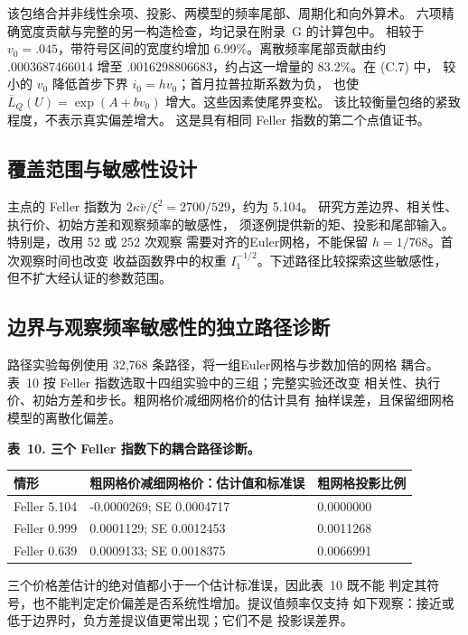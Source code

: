 该包络合并非线性余项、投影、两模型的频率尾部、周期化和向外算术。
六项精确宽度贡献与完整的另一构造检查，均记录在附录~G 的计算包中。
相较于 \(v_0=.045\)，带符号区间的宽度约增加
6.99\%。离散频率尾部贡献由约 .0003687466014 增至
.0016298806683，约占这一增量的 83.2\%。在 (C.7) 中，
较小的 \(v_0\) 降低首步下界 \(i_0=hv_0\)；首月拉普拉斯系数为负，
也使 \(\overline L_Q(U)=\exp(A+bv_0)\) 增大。这些因素使尾界变松。
该比较衡量包络的紧致程度，不表示真实偏差增大。
这是具有相同 Feller 指数的第二个点值证书。

\subsection{覆盖范围与敏感性设计}

主点的 Feller 指数为
\(2\kappa\bar v/\xi^2=2700/529\)，约为 5.104。
研究方差边界、相关性、执行价、初始方差和观察频率的敏感性，
须逐例提供新的矩、投影和尾部输入。特别是，改用 52 或 252 次观察
需要对齐的Euler网格，不能保留 \(h=1/768\)。首次观察时间也改变
收益函数界中的权重 \(I_1^{-1/2}\)。下述路径比较探索这些敏感性，
但不扩大经认证的参数范围。

\subsection{边界与观察频率敏感性的独立路径诊断}

路径实验每例使用 32,768 条路径，将一组Euler网格与步数加倍的网格
耦合。表~10 按 Feller 指数选取十四组实验中的三组；完整实验还改变
相关性、执行价、初始方差和步长。粗网格价减细网格价的估计具有
抽样误差，且保留细网格模型的离散化偏差。

\noindent\textbf{表~10. 三个 Feller 指数下的耦合路径诊断。}
\begin{center}
\begin{tabularx}{\textwidth}{@{}l X X@{}}
\toprule
情形 & 粗网格价减细网格价：估计值和标准误 & 粗网格投影比例 \\
\midrule
Feller 5.104 & -0.0000269; SE 0.0004717 & 0.0000000 \\
Feller 0.999 & 0.0001129; SE 0.0012453 & 0.0011268 \\
Feller 0.639 & 0.0009133; SE 0.0018375 & 0.0066991 \\
\bottomrule
\end{tabularx}
\end{center}

三个价格差估计的绝对值都小于一个估计标准误，因此表~10 既不能
判定其符号，也不能判定定价偏差是否系统性增加。提议值频率仅支持
如下观察：接近或低于边界时，负方差提议值更常出现；它们不是
投影误差界。

